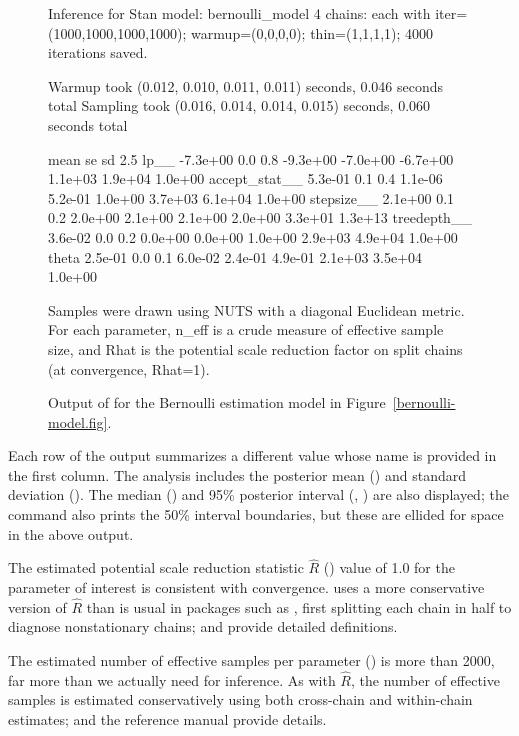 \documentclass[article]{jss}
\begin{document}
\begin{figure}
\small
\begin{Code}
Inference for Stan model: bernoulli_model
4 chains: each with iter=(1000,1000,1000,1000); warmup=(0,0,0,0); thin=(1,1,1,1); 
4000 iterations saved.

Warmup took (0.012, 0.010, 0.011, 0.011) seconds, 0.046 seconds total
Sampling took (0.016, 0.014, 0.014, 0.015) seconds, 0.060 seconds total

                  mean   se   sd     2.5%
lp__          -7.3e+00  0.0  0.8 -9.3e+00 -7.0e+00 -6.7e+00 1.1e+03 1.9e+04 1.0e+00
accept_stat__  5.3e-01  0.1  0.4  1.1e-06  5.2e-01  1.0e+00 3.7e+03 6.1e+04 1.0e+00
stepsize__     2.1e+00  0.1  0.2  2.0e+00  2.1e+00  2.1e+00 2.0e+00 3.3e+01 1.3e+13
treedepth__    3.6e-02  0.0  0.2  0.0e+00  0.0e+00  1.0e+00 2.9e+03 4.9e+04 1.0e+00
theta          2.5e-01  0.0  0.1  6.0e-02  2.4e-01  4.9e-01 2.1e+03 3.5e+04 1.0e+00

Samples were drawn using NUTS with a diagonal Euclidean metric.
For each parameter, n_eff is a crude measure of effective sample size,
and Rhat is the potential scale reduction factor on split chains (at 
convergence, Rhat=1).
\end{Code}
\caption{Output of  for the Bernoulli estimation model in
  Figure~\ref{bernoulli-model.fig}.}\label{print-output.fig}
\end{figure}
%
Each row of the output summarizes a different value whose name is
provided in the first column.  The analysis includes the posterior
mean () and standard deviation ().  The median
() and 95\% posterior interval (, )
are also displayed; the  command also prints the 50\%
interval boundaries, but these are ellided for space in the above
output.

The estimated potential scale reduction statistic $\hat{R}$
() value of 1.0 for the parameter of interest 
is consistent with convergence.   uses a more
conservative version of $\hat{R}$ than is usual in packages such as
 \citep{PlummerEtAl:2006}, first splitting each chain in half to diagnose
nonstationary chains; \citep{GelmanEtAl:2013}
and \citep{Stan:2013} provide detailed definitions.

The estimated number of effective samples per parameter
() is more than 2000, far more than we actually need for
inference.  As with $\hat{R}$, the number of effective samples is
estimated conservatively using both cross-chain and within-chain
estimates; \citep{GelmanEtAl:2013} and the reference manual provide
details.
\end{document}
